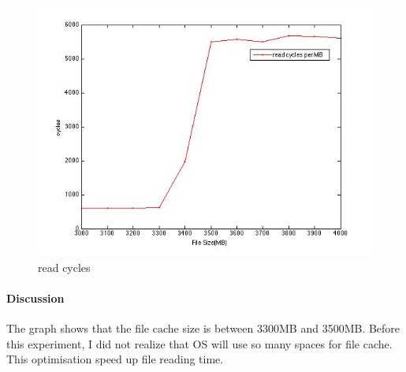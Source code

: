 \begin{figure}[htbp] %
   \centering
   \includegraphics[width=5in]{./pics/41.jpg} 
   \caption{read cycles}
   \label{fig:read cycles}
\end{figure}

\paragraph{Discussion}
The graph shows that the file cache size is between 3300MB and 3500MB. Before this experiment, I did not realize that OS will use so many spaces for file cache. This optimisation speed up file reading time.
